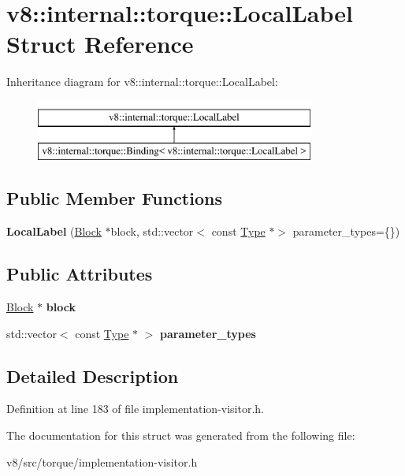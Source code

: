 \hypertarget{structv8_1_1internal_1_1torque_1_1LocalLabel}{}\section{v8\+:\+:internal\+:\+:torque\+:\+:Local\+Label Struct Reference}
\label{structv8_1_1internal_1_1torque_1_1LocalLabel}
Inheritance diagram for v8\+:\+:internal\+:\+:torque\+:\+:Local\+Label\+:\begin{figure}[H]
\begin{center}
\leavevmode
\includegraphics[height=2.000000cm]{structv8_1_1internal_1_1torque_1_1LocalLabel}
\end{center}
\end{figure}
\subsection*{Public Member Functions}
\begin{DoxyCompactItemize}
\item 
\mbox{\label{structv8_1_1internal_1_1torque_1_1LocalLabel_a602877b22214fc565b491c3a42aa1ac5}} 
{\bfseries Local\+Label} (\mbox{\hyperlink{classv8_1_1internal_1_1torque_1_1Block}{Block}} $\ast$block, std\+::vector$<$ const \mbox{\hyperlink{classv8_1_1internal_1_1torque_1_1Type}{Type}} $\ast$$>$ parameter\+\_\+types=\{\})
\end{DoxyCompactItemize}
\subsection*{Public Attributes}
\begin{DoxyCompactItemize}
\item 
\mbox{\label{structv8_1_1internal_1_1torque_1_1LocalLabel_ae55834aeec7797d9bfd63185f6068421}} 
\mbox{\hyperlink{classv8_1_1internal_1_1torque_1_1Block}{Block}} $\ast$ {\bfseries block}
\item 
\mbox{\label{structv8_1_1internal_1_1torque_1_1LocalLabel_af7e94cb085aa01682b8ebb6c8fbf3437}} 
std\+::vector$<$ const \mbox{\hyperlink{classv8_1_1internal_1_1torque_1_1Type}{Type}} $\ast$ $>$ {\bfseries parameter\+\_\+types}
\end{DoxyCompactItemize}


\subsection{Detailed Description}


Definition at line 183 of file implementation-\/visitor.\+h.



The documentation for this struct was generated from the following file\+:\begin{DoxyCompactItemize}
\item 
v8/src/torque/implementation-\/visitor.\+h\end{DoxyCompactItemize}
